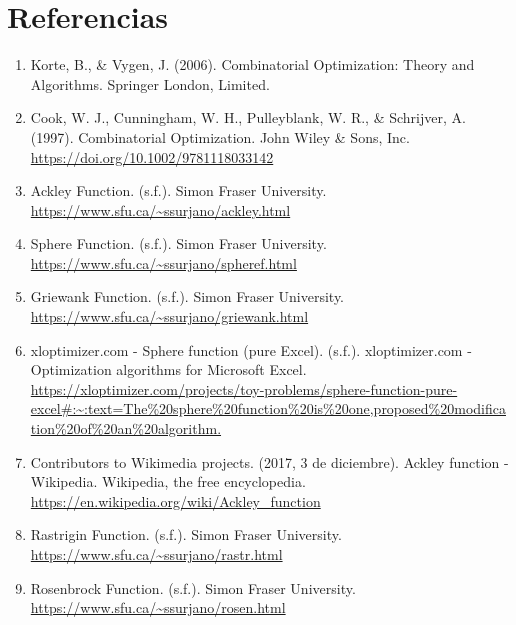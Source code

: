\documentclass{article}
\begin{document}
\section*{Referencias}
\begin{enumerate}
	\item Korte, B., \& Vygen, J. (2006). Combinatorial Optimization: Theory and Algorithms. Springer London, Limited.
	\item Cook, W. J., Cunningham, W. H., Pulleyblank, W. R., \& Schrijver, A. (1997). Combinatorial Optimization. John Wiley \& Sons, Inc. \url{https://doi.org/10.1002/9781118033142}
	\item Ackley Function. (s.f.). Simon Fraser University. \url{https://www.sfu.ca/~ssurjano/ackley.html}
	\item Sphere Function. (s.f.). Simon Fraser University. \url{https://www.sfu.ca/~ssurjano/spheref.html}
	\item Griewank Function. (s.f.). Simon Fraser University. \url{https://www.sfu.ca/~ssurjano/griewank.html}
	\item xloptimizer.com - Sphere function (pure Excel). (s.f.). xloptimizer.com - Optimization algorithms for Microsoft Excel. \url{https://xloptimizer.com/projects/toy-problems/sphere-function-pure-excel#:~:text=The%20sphere%20function%20is%20one,proposed%20modification%20of%20an%20algorithm.}
	\item Contributors to Wikimedia projects. (2017, 3 de diciembre). Ackley function - Wikipedia. Wikipedia, the free encyclopedia. \url{https://en.wikipedia.org/wiki/Ackley_function}
	\item Rastrigin Function. (s.f.). Simon Fraser University. \url{https://www.sfu.ca/~ssurjano/rastr.html}
	\item Rosenbrock Function. (s.f.). Simon Fraser University. \url{https://www.sfu.ca/~ssurjano/rosen.html}	
\end{enumerate}
\end{document}

